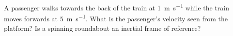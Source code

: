 
\begin{selfcheck}
A passenger walks towards the back of the train at \SI{1}{\metre\per\second}
while the train moves forwards at \SI{5}{\metre\per\second}. What is the
passenger's velocity seen from the platform? Is a spinning roundabout an
inertial frame of reference?
\end{selfcheck}
